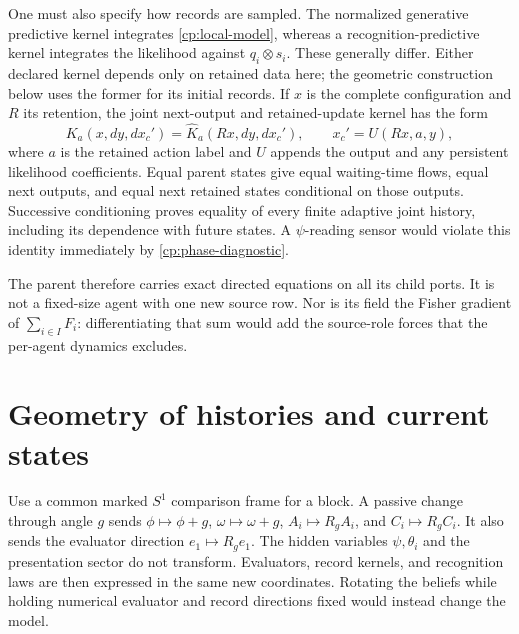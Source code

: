 One must also specify how records are sampled. The normalized generative predictive kernel integrates \cref{cp:local-model}, whereas a recognition-predictive kernel integrates the likelihood against $q_i\otimes s_i$. These generally differ. Either declared kernel depends only on retained data here; the geometric construction below uses the former for its initial records. If $x$ is the complete configuration and $R$ its retention, the joint next-output and retained-update kernel has the form
\begin{equation}
 K_a(x,dy,dx_c')
 =\widehat K_a(Rx,dy,dx_c'),\qquad
 x_c'=U(Rx,a,y),
 \label{cp:joint-kernel}
\end{equation}
where $a$ is the retained action label and $U$ appends the output and any persistent likelihood coefficients. Equal parent states give equal waiting-time flows, equal next outputs, and equal next retained states conditional on those outputs. Successive conditioning proves equality of every finite adaptive joint history, including its dependence with future states. A $\psi$-reading sensor would violate this identity immediately by \cref{cp:phase-diagnostic}.

The parent therefore carries exact directed equations on all its child ports. It is not a fixed-size agent with one new source row. Nor is its field the Fisher gradient of $\sum_{i\in I}F_i$: differentiating that sum would add the source-role forces that the per-agent dynamics excludes.

\section{Geometry of histories and current states}

Use a common marked $S^1$ comparison frame for a block. A passive change through angle $g$ sends $\phi\mapsto\phi+g$, $\omega\mapsto\omega+g$, $A_i\mapsto R_gA_i$, and $C_i\mapsto R_gC_i$. It also sends the evaluator direction $e_1\mapsto R_ge_1$. The hidden variables $\psi,\theta_i$ and the presentation sector do not transform. Evaluators, record kernels, and recognition laws are then expressed in the same new coordinates. Rotating the beliefs while holding numerical evaluator and record directions fixed would instead change the model.

